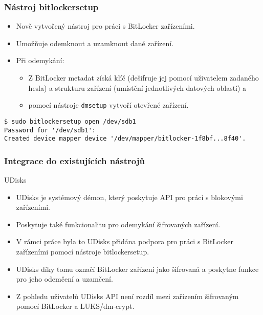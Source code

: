 \documentclass{beamer}
\begin{document}
\begin{frame}[fragile]
	\frametitle{Nástroj bitlockersetup}

	\begin{block}{}
		\begin{itemize}
			\item Nově vytvořený nástroj pro práci s BitLocker zařízeními.
			\item Umožňuje odemknout a uzamknout dané zařízení.
			\item Při odemykání:
			\begin{itemize}
				\item Z BitLocker metadat získá klíč (dešifruje jej pomocí uživatelem zadaného hesla) a strukturu zařízení (umístění jednotlivých datových oblastí) a
				\item pomocí nástroje \texttt{dmsetup} vytvoří otevřené zařízení.
			\end{itemize}
		\end{itemize}
	\end{block}

\vspace{0.5cm}
	
\begin{lstlisting}[frame=none, basicstyle=\ttfamily\small, columns=fullflexible, keepspaces=true]
$ sudo bitlockersetup open /dev/sdb1
Password for '/dev/sdb1': 
Created device mapper device '/dev/mapper/bitlocker-1f8bf...8f40'.
\end{lstlisting}

\end{frame}

\begin{frame}
	\frametitle{Integrace do existujících nástrojů}

	\begin{block}{UDisks}
		\begin{itemize}
			\item UDisks je systémový démon, který poskytuje API pro práci s blokovými zařízeními.
			\item Poskytuje také funkcionalitu pro odemykání šifrovaných zařízení.
			\item V rámci práce byla to UDisks přidána podpora pro práci s BitLocker zařízeními pomocí nástroje bitlockersetup.
			\item UDisks díky tomu označí BitLocker zařízení jako šifrovaná a poskytne funkce pro jeho odemčení a uzamčení.
			\item Z pohledu uživatelů UDisks API není rozdíl mezi zařízením šifrovaným pomocí BitLocker a LUKS/dm-crypt.
		\end{itemize}
	\end{block}
\end{frame}
\end{document}

